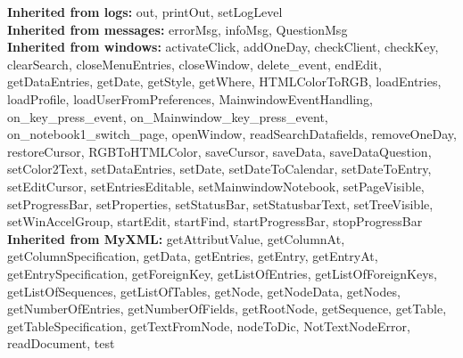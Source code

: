   \textbf{Inherited from logs:}
    out,
    printOut,
    setLogLevel
    \\
  \textbf{Inherited from messages:}
    errorMsg,
    infoMsg,
    QuestionMsg
    \\
  \textbf{Inherited from windows:}
    activateClick,
    addOneDay,
    checkClient,
    checkKey,
    clearSearch,
    closeMenuEntries,
    closeWindow,
    delete\_event,
    endEdit,
    getDataEntries,
    getDate,
    getStyle,
    getWhere,
    HTMLColorToRGB,
    loadEntries,
    loadProfile,
    loadUserFromPreferences,
    MainwindowEventHandling,
    on\_key\_press\_event,
    on\_Mainwindow\_key\_press\_event,
    on\_notebook1\_switch\_page,
    openWindow,
    readSearchDatafields,
    removeOneDay,
    restoreCursor,
    RGBToHTMLColor,
    saveCursor,
    saveData,
    saveDataQuestion,
    setColor2Text,
    setDataEntries,
    setDate,
    setDateToCalendar,
    setDateToEntry,
    setEditCursor,
    setEntriesEditable,
    setMainwindowNotebook,
    setPageVisible,
    setProgressBar,
    setProperties,
    setStatusBar,
    setStatusbarText,
    setTreeVisible,
    setWinAccelGroup,
    startEdit,
    startFind,
    startProgressBar,
    stopProgressBar
    \\
  \textbf{Inherited from MyXML:}
    getAttributValue,
    getColumnAt,
    getColumnSpecification,
    getData,
    getEntries,
    getEntry,
    getEntryAt,
    getEntrySpecification,
    getForeignKey,
    getListOfEntries,
    getListOfForeignKeys,
    getListOfSequences,
    getListOfTables,
    getNode,
    getNodeData,
    getNodes,
    getNumberOfEntries,
    getNumberOfFields,
    getRootNode,
    getSequence,
    getTable,
    getTableSpecification,
    getTextFromNode,
    nodeToDic,
    NotTextNodeError,
    readDocument,
    test
